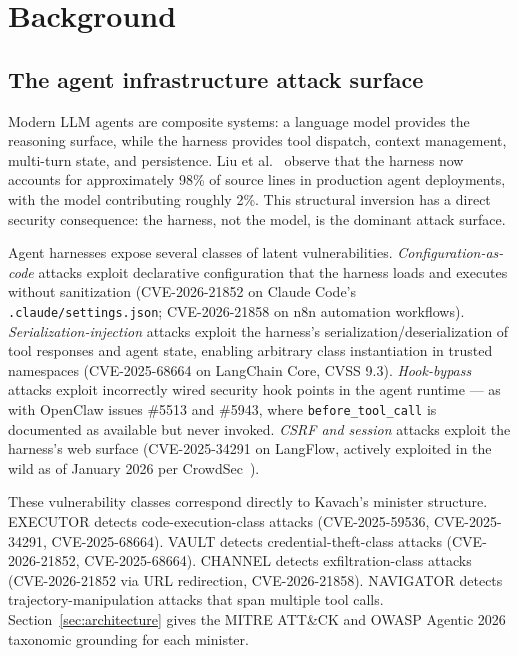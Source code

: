 
\section{Background}
\label{sec:background}

\subsection{The agent infrastructure attack surface}

Modern LLM agents are composite systems: a language model provides the
reasoning surface, while the harness provides tool dispatch, context management,
multi-turn state, and persistence. Liu et al.~\cite{liu2026clawdesign} observe
that the harness now accounts for approximately 98\% of source lines in
production agent deployments, with the model contributing roughly 2\%. This
structural inversion has a direct security consequence: the harness, not the
model, is the dominant attack surface.

Agent harnesses expose several classes of latent vulnerabilities.
\emph{Configuration-as-code} attacks exploit declarative configuration that
the harness loads and executes without sanitization (CVE-2026-21852 on Claude
Code's \texttt{.claude/settings.json}; CVE-2026-21858 on n8n automation
workflows). \emph{Serialization-injection} attacks exploit the harness's
serialization/deserialization of tool responses and agent state, enabling
arbitrary class instantiation in trusted namespaces (CVE-2025-68664 on
LangChain Core, CVSS 9.3). \emph{Hook-bypass} attacks exploit incorrectly
wired security hook points in the agent runtime — as with OpenClaw issues
\#5513 and \#5943, where \texttt{before\_tool\_call} is documented as available
but never invoked. \emph{CSRF and session} attacks exploit the harness's web
surface (CVE-2025-34291 on LangFlow, actively exploited in the wild as of
January 2026 per CrowdSec~\cite{crowdsec2026langflow}).

These vulnerability classes correspond directly to Kavach's minister structure.
EXECUTOR detects code-execution-class attacks (CVE-2025-59536, CVE-2025-34291,
CVE-2025-68664). VAULT detects credential-theft-class attacks (CVE-2026-21852,
CVE-2025-68664). CHANNEL detects exfiltration-class attacks (CVE-2026-21852
via URL redirection, CVE-2026-21858). NAVIGATOR detects trajectory-manipulation
attacks that span multiple tool calls. Section~\ref{sec:architecture} gives the
MITRE ATT\&CK and OWASP Agentic 2026 taxonomic grounding for each minister.

